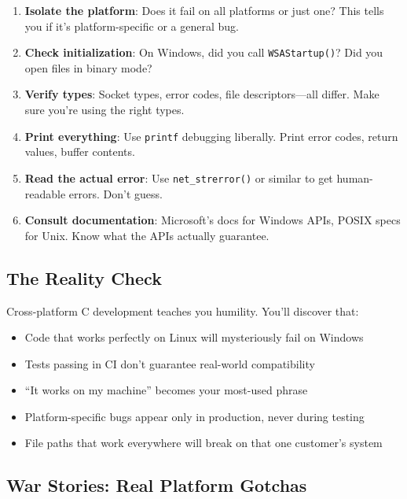 \begin{enumerate}
    \item \textbf{Isolate the platform}: Does it fail on all platforms or just one? This tells you if it's platform-specific or a general bug.

    \item \textbf{Check initialization}: On Windows, did you call \texttt{WSAStartup()}? Did you open files in binary mode?

    \item \textbf{Verify types}: Socket types, error codes, file descriptors---all differ. Make sure you're using the right types.

    \item \textbf{Print everything}: Use \texttt{printf} debugging liberally. Print error codes, return values, buffer contents.

    \item \textbf{Read the actual error}: Use \texttt{net\_strerror()} or similar to get human-readable errors. Don't guess.

    \item \textbf{Consult documentation}: Microsoft's docs for Windows APIs, POSIX specs for Unix. Know what the APIs actually guarantee.
\end{enumerate}

\subsection{The Reality Check}

Cross-platform C development teaches you humility. You'll discover that:

\begin{itemize}
    \item Code that works perfectly on Linux will mysteriously fail on Windows
    \item Tests passing in CI don't guarantee real-world compatibility
    \item ``It works on my machine'' becomes your most-used phrase
    \item Platform-specific bugs appear only in production, never during testing
    \item File paths that work everywhere will break on that one customer's system
\end{itemize}

\subsection{War Stories: Real Platform Gotchas}

